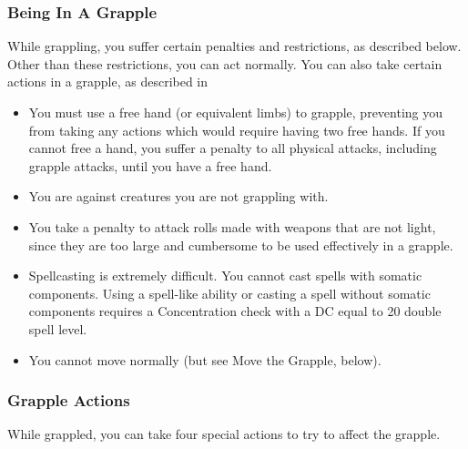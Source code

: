 \subsubsection{Being In A Grapple}
While grappling, you suffer certain penalties and restrictions, as described below. Other than these restrictions, you can act normally. You can also take certain actions in a grapple, as described in  
\begin{itemize}
    \item You must use a free hand (or equivalent limbs) to grapple, preventing you from taking any actions which would require having two free hands. If you cannot free a hand, you suffer a  penalty to all physical attacks, including grapple attacks, until you have a free hand.
    \item You are \vulnerable against creatures you are not grappling with.
    \item You take a  penalty to attack rolls made with weapons that are not light, since they are too large and cumbersome to be used effectively in a grapple.
    \item Spellcasting is extremely difficult. You cannot cast spells with somatic components. Using a spell-like ability or casting a spell without somatic components requires a Concentration check with a DC equal to 20 \add double spell level.
    \item You cannot move normally (but see Move the Grapple, below).
\end{itemize}

\subsubsection{Grapple Actions}\label{Grapple Actions}
While grappled, you can take four special actions to try to affect the grapple.

